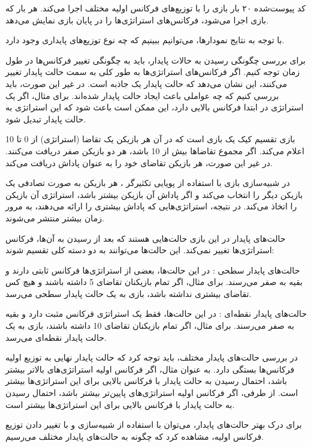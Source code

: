 کد پیوست‌شده ۲۰ بار بازی را با توزیع‌های فرکانس اولیه مختلف اجرا می‌کند. هر بار که بازی اجرا می‌شود، فرکانس‌های استراتژی‌ها را در پایان بازی نمایش می‌دهد.

با توجه به نتایج نمودارها، می‌توانیم ببینیم که چه نوع توزیع‌های پایداری وجود دارد.

برای بررسی چگونگی رسیدن به حالات پایدار، باید به چگونگی تغییر فرکانس‌ها در طول زمان توجه کنیم. اگر فرکانس‌های استراتژی‌ها به طور کلی به سمت حالت پایدار تغییر می‌کنند، این نشان می‌دهد که حالت پایدار یک جاذبه است. در غیر این صورت، باید بررسی کنیم که چه عواملی باعث ایجاد حالت پایدار شده‌اند. برای مثال، اگر یک استراتژی در ابتدا فرکانس بالایی دارد، این ممکن است باعث شود که این استراتژی به حالت پایدار تبدیل شود.

بازی تقسیم کیک یک بازی است که در آن هر بازیکن یک تقاضا (استراتژی) از 0 تا 10 اعلام می‌کند. اگر مجموع تقاضاها بیش از 10 باشد، هر دو بازیکن صفر دریافت می‌کنند. در غیر این صورت، هر بازیکن تقاضای خود را به عنوان پاداش دریافت می‌کند.

در شبیه‌سازی بازی با استفاده از پویایی تکثیرگر 
، هر بازیکن به صورت تصادفی یک بازیکن دیگر را انتخاب می‌کند و اگر پاداش آن بازیکن بیشتر باشد، استراتژی آن بازیکن را اتخاذ می‌کند. در نتیجه، استراتژی‌هایی که پاداش بیشتری را ارائه می‌دهند، به مرور زمان بیشتر منتشر می‌شوند.

حالت‌های پایدار در این بازی حالت‌هایی هستند که بعد از رسیدن به آن‌ها، فرکانس استراتژی‌ها تغییر نمی‌کند. این حالت‌ها می‌توانند به دو دسته کلی تقسیم شوند:

حالت‌های پایدار سطحی 
: در این حالت‌ها، بعضی از استراتژی‌ها فرکانس ثابتی دارند و بقیه به صفر می‌رسند. برای مثال، اگر تمام بازیکنان تقاضای 5 داشته باشند و هیچ کس تقاضای بیشتری نداشته باشد، بازی به یک حالت پایدار سطحی می‌رسد.

حالت‌های پایدار نقطه‌ای 
: در این حالت‌ها، فقط یک استراتژی فرکانس مثبت دارد و بقیه به صفر می‌رسند. برای مثال، اگر تمام بازیکنان تقاضای 10 داشته باشند، بازی به یک حالت پایدار نقطه‌ای می‌رسد.

در بررسی حالت‌های پایدار مختلف، باید توجه کرد که حالت پایدار نهایی به توزیع اولیه فرکانس‌ها بستگی دارد. به عنوان مثال، اگر فرکانس اولیه استراتژی‌های بالاتر بیشتر باشد، احتمال رسیدن به حالت پایدار با فرکانس بالایی برای این استراتژی‌ها بیشتر است. از طرفی، اگر فرکانس اولیه استراتژی‌های پایین‌تر بیشتر باشد، احتمال رسیدن به حالت پایدار با فرکانس بالایی برای این استراتژی‌ها بیشتر است.

برای درک بهتر حالت‌های پایدار، می‌توان با استفاده از شبیه‌سازی و با تغییر دادن توزیع فرکانس اولیه، مشاهده کرد که چگونه به حالت‌های پایدار مختلف می‌رسیم.

